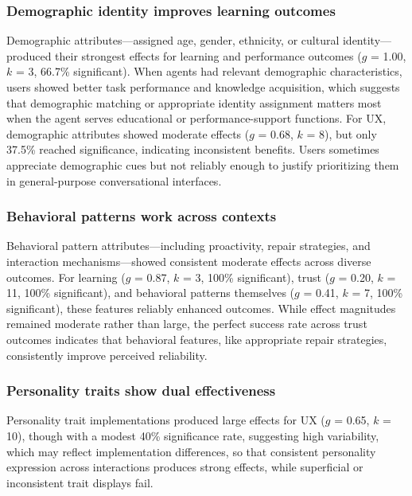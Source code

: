 \documentclass[manuscript,anonymous,sigconf]{acmart}
\begin{document}
\subsubsection{Demographic identity improves learning outcomes}

Demographic attributes—assigned age, gender, ethnicity, or cultural identity—produced their strongest effects for learning and performance outcomes ($g$ = 1.00, $k$ = 3, 66.7\% significant). When agents had relevant demographic characteristics, users showed better task performance and knowledge acquisition, which suggests that demographic matching or appropriate identity assignment matters most when the agent serves educational or performance-support functions.
For UX, demographic attributes showed moderate effects ($g$ = 0.68, $k$ = 8), but only 37.5\% reached significance, indicating inconsistent benefits. Users sometimes appreciate demographic cues but not reliably enough to justify prioritizing them in general-purpose conversational interfaces.

\subsubsection{Behavioral patterns work across contexts}

Behavioral pattern attributes---including proactivity, repair strategies, and interaction mechanisms---showed consistent moderate effects across diverse outcomes. For learning ($g$ = 0.87, $k$ = 3, 100\% significant), trust ($g$ = 0.20, $k$ = 11, 100\% significant), and behavioral patterns themselves ($g$ = 0.41, $k$ = 7, 100\% significant), these features reliably enhanced outcomes. While effect magnitudes remained moderate rather than large, the perfect success rate across trust outcomes indicates that behavioral features, like appropriate repair strategies, consistently improve perceived reliability.

\subsubsection{Personality traits show dual effectiveness}\label{sec:person}

Personality trait implementations produced large effects for UX ($g$ = 0.65, $k$ = 10), though with a modest 40\% significance rate, suggesting high variability, %
which may reflect implementation differences, so that consistent personality expression across interactions produces strong effects, while superficial or inconsistent trait displays fail.
\end{document}
